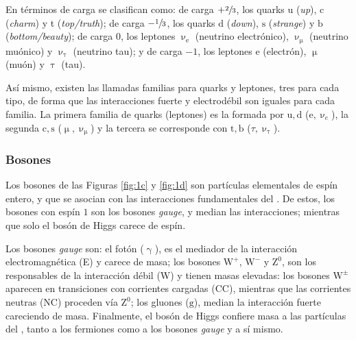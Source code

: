 En términos de carga \color{vero} se clasifican \color{norm} como:  de carga $+\sfrac{2}{3}$, los quarks u (\emph{up}), c  (\emph{charm}) y t (\emph{top/truth}); de carga $-\sfrac{1}{3}$, los quarks $\mathrm{d}$ (\emph{down}), $\mathrm{s}$ (\emph{strange}) y $\mathrm{b}$ (\emph{bottom/beauty}); de carga $0$, los leptones $\upnu_{\text{e}}$ (neutrino electrónico), $\upnu_{\upmu}$ (neutrino muónico) y $\upnu_{\uptau}$ (neutrino tau); y de carga $-1$, los leptones $\text{e}$ (electrón), $\upmu$ (muón) y $\uptau$ (tau).

Así mismo, existen las llamadas familias para quarks y leptones, tres para cada tipo, de forma que las interacciones fuerte y electrodébil son iguales para cada familia. La primera familia de quarks (leptones) es la formada por $\mathrm{u,d}$ ($\text{e},\upnu_e$), la segunda $\mathrm{c,s}$ ($\upmu,\upnu_{\upmu}$) y la tercera se corresponde con $\mathrm{t,b}$ ($\tau,\upnu_{\uptau}$).



\subsubsection{Bosones} %

\color{dieg}
Los bosones de las \color{vero} Figuras \ref{fig:1c} y \ref{fig:1d} \color{norm} son partículas elementales de espín entero, y que se asocian con las interacciones fundamentales del \stdmod. De estos, los bosones con espín \color{vero} $1$ \color{norm} son los bosones \emph{gauge}, y median las interacciones; mientras que solo el bosón de Higgs carece de espín. \color{norm}
  
Los bosones \emph{gauge} son: el fotón ($\upgamma$), es el mediador de la interacción electromagnética (E) y carece de masa; los bosones $\mathrm{W^+}$, $\mathrm{W^-}$ y $\mathrm{Z^0}$, son los responsables de la interacción débil (W) y tienen masas elevadas: los bosones $\mathrm{W^{\pm}}$ aparecen en transiciones con corrientes cargadas (CC), mientras que las corrientes neutras (NC) proceden vía $\mathrm{Z^0}$; los gluones ($\mathrm{g}$), median la interacción fuerte careciendo de masa.
%
\color{dieg}
Finalmente, el bosón de Higgs \color{vero} confiere  masa a las partículas del \stdmod, tanto a los fermiones como a los bosones \emph{gauge} y a sí mismo. \color{norm}



